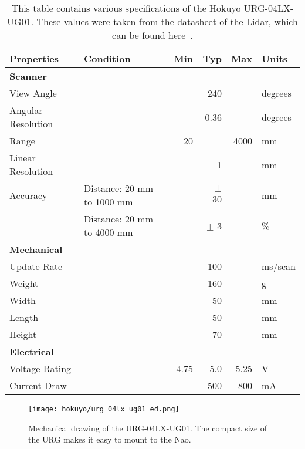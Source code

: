 \begin{table}
\centering
\begin{tabulary}{\textwidth}{|l||l|r|r|r|l|}
\hline
\textbf{Properties}& \textbf{Condition}         & \textbf{Min} & \textbf{Typ} & \textbf{Max} & \textbf{Units} \\	\hline\hline
\textbf{Scanner}   &                            &              &              &              &                \\	\hline
View Angle 	       &                            &              & 240          &              & degrees        \\	\hline
Angular Resolution &                            &              & 0.36         &              & degrees        \\	\hline
Range 	           &                            & 20           &              & 4000         & mm             \\	\hline 
Linear Resolution  &                            &              & 1            &              & mm             \\	\hline 
Accuracy           & Distance: 20 mm to 1000 mm &              & $\pm$ 30     &              & mm             \\	\hline 
        	       & Distance: 20 mm to 4000 mm &              & $\pm$ 3      &              & \%             \\	\hline \hline 
\textbf{Mechanical}&                            &              &              &              &                \\	\hline
Update Rate	       &                            &              & 100          &              & ms/scan        \\	\hline 
Weight             &                            &              & 160          &              & g              \\	\hline 
Width              &                            &              & 50           &              & mm             \\	\hline 
Length             &                            &              & 50           &              & mm             \\	\hline 
Height             &                            &              & 70           &              & mm             \\	\hline \hline
\textbf{Electrical}&                            &              &              &              &                \\	\hline 
Voltage Rating     &                            & 4.75         & 5.0          & 5.25         & V              \\	\hline 
Current Draw       &                            &              & 500          & 800          & mA             \\	\hline 
\end{tabulary} 
\caption{This table contains various specifications of the Hokuyo URG-04LX-UG01.
         These values were taken from the datasheet of the Lidar, which can be found here~\cite{urg_specs}.}
\label{tab:lidar_params1}
\end{table}

\begin{figure}
\centering
\texttt{[image: hokuyo/urg\_04lx\_ug01\_ed.png]}
\caption{Mechanical drawing of the URG-04LX-UG01.
         The compact size of the URG makes it easy to mount to the Nao.}
\label{fig:lidar_diagram1}
\end{figure}
